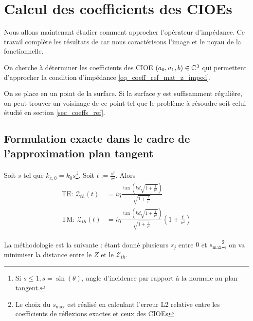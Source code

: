 \section{Calcul des coefficients des CIOEs}\label{sec_coeffs_cioe}

Nous allons maintenant étudier comment approcher l'opérateur d'impédance. Ce travail complète les résultats de \cite[Annexe~A]{stupfel_implementation_2015} car nous caractérisons l'image et le noyau de la fonctionnelle.

On cherche à déterminer les coefficients des CIOE $(a_0,a_1,b) \in \mathbb C^3$ qui permettent d'approcher la condition d'impédance \eqref{eq_coeff_ref_mat_z_imped}.


On se place en un point de la surface. Si la surface y est suffisamment régulière, on peut trouver un voisinage de ce point tel que le problème à résoudre soit celui étudié en section \ref{sec_coeffs_ref}.

\subsection{Formulation exacte dans le cadre de l'approximation plan tangent}

Soit $s$ tel que $k_{x,0} = k_0s$\footnote{Si  $s \le 1, s=\sin(\theta)$, angle d'incidence par rapport à la normale au plan tangent.}. Soit $t := \frac{s^2}{\nu^2}$. Alors
\begin{align*}
  \text{TE: } \mathcal Z_{th}(t) &= i\eta \frac{\tan\left(kd\sqrt{1+\frac{t}{\nu^2}}\right)}{\sqrt{1+\frac{t}{\nu^2}}}\\
  \text{TM: } \mathcal Z_{th}(t) &= i\eta \frac{\tan\left(kd\sqrt{1+\frac{t}{\nu^2}}\right)}{\sqrt{1+\frac{t}{\nu^2}}}(1+\frac{t}{\nu^2})
\end{align*}

La méthodologie est la suivante : étant donné plusieurs $s_j$ entre $0$ et $s_{\max}$\footnote{Le choix du $s_{\max}$ est réalisé en calculant l'erreur L2 relative entre les coefficients de réflexions exactes et ceux des CIOEs}, on va minimiser la distance entre le $Z$ et le $\mathcal{Z}_{th}$.


